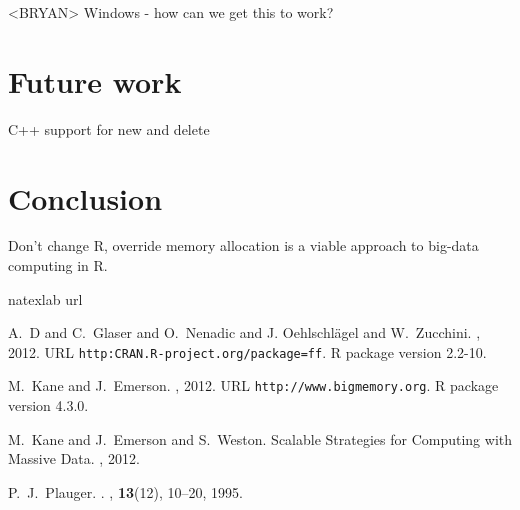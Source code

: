 <BRYAN> Windows - how can we get this to work?

\section{Future work}

C++ support for new and delete

\section{Conclusion}

Don't change R, override memory allocation is a viable approach to big-data 
computing in R.


%

%

\begin{thebibliography}{1}
\expandafter\ifx\csname natexlab\endcsname\relax\def\natexlab#1{#1}\fi
\expandafter\ifx\csname url\endcsname\relax
  \def\url#1{{\tt #1}}\fi

A.~D and C.~Glaser and O.~Nenadic and J. Oehlschl\"agel and W.~Zucchini.
, 2012.
\newblock URL \url{http:CRAN.R-project.org/package=ff}.
\newblock R package version 2.2-10.


M.~Kane and J.~Emerson.
, 2012.
\newblock URL \url{http://www.bigmemory.org}.
\newblock R package version 4.3.0.

M.~Kane and J.~Emerson and S.~Weston.
\newblock Scalable Strategies for Computing with Massive Data.
, 2012.

P.~J.~Plauger.
.
, {\bf 13}(12), 10--20, 1995.

\end{thebibliography}


